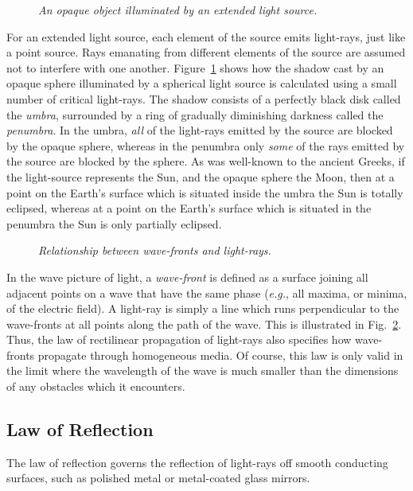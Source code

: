\begin{figure}
\epsfysize=3in
\centerline{}
\caption{\em An opaque object illuminated by an extended light source.}\label{f12.2}
\end{figure}

For an extended light 
source, each element of the source emits light-rays, just
like a point source.  Rays emanating from different
elements of the source are assumed  not to interfere
with one another. Figure~\ref{f12.2} shows how the shadow
cast by an opaque sphere  illuminated by a spherical
light source is calculated using a small
number of critical light-rays. The 
shadow consists of
a perfectly black disk called the {\em umbra}, surrounded by
a ring of gradually diminishing darkness called the
{\em penumbra}. In the umbra, {\em all} of the light-rays emitted
by the source are blocked by the opaque sphere, whereas in the penumbra
only {\em some}\/ of the rays emitted by the source are blocked
by the sphere. As was well-known to the ancient Greeks, if
the light-source represents the Sun, and the opaque sphere  the
 Moon,
then at a  point on the Earth's surface which is situated inside
the umbra the Sun is totally eclipsed, whereas at a point
on the Earth's surface which is situated in the penumbra
the Sun is only partially eclipsed. 

\begin{figure}
\epsfysize=3in
\centerline{}
\caption{\em Relationship between wave-fronts and light-rays.}\label{f12.3}
\end{figure}

In the wave picture of light, a {\em wave-front}\/ is defined as a
surface joining all adjacent points on a wave that have the same
phase ({\em e.g.}, all maxima, or minima, of the electric field).  A
light-ray is simply a line which runs perpendicular to the wave-fronts
at all points along the path of the wave. This is illustrated
in Fig.~\ref{f12.3}. Thus, the law of rectilinear propagation
of light-rays
also specifies how wave-fronts propagate through homogeneous
media. Of course, this law is only valid in the limit where the wavelength of
the wave is much smaller than the dimensions of any obstacles which it encounters. 

\subsection{Law of Reflection}
The law of reflection governs the reflection of light-rays off
 smooth conducting surfaces, such as polished metal or metal-coated
glass mirrors.

